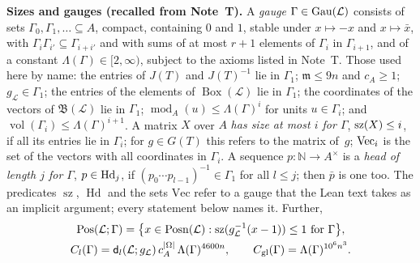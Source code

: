 \documentclass[11pt,a4paper]{article}
\newcommand{\m}[1]{\mbox{$#1$}}        %
\newcommand{\subhead}[1]{\par\addvspace{9pt plus 2pt}\Needspace{4\baselineskip}\noindent\textbf{#1}\enspace\ignorespaces}
\theoremstyle{plainx}
\theoremstyle{uprightx}
\newcommand{\cL}{\mathcal{L}}
\newcommand{\NN}{\mathbb{N}}
\newcommand{\GT}[1]{G(#1)}
\newcommand{\JT}[1]{J(#1)}
\newcommand{\modA}{\operatorname{mod}_A}
\newcommand{\gL}[1]{g_{#1}}
\newcommand{\BoxL}[1]{\operatorname{Box}(#1)}
\newcommand{\Posn}[1]{\operatorname{Posn}(#1)}
\newcommand{\Ball}[1]{\mathfrak{B}(#1)}
\newcommand{\vol}{\operatorname{vol}}
\begin{document}
\subhead{Sizes and gauges (recalled from Note~T).} A \emph{gauge} $\Gamma\in\Gauges{\cL}$ consists of sets
$\Gamma_0,\Gamma_1,\dots\subseteq A$, compact, containing $0$ and $1$, stable under $x\mapsto-x$ and $x\mapsto\bar x$,
with $\Gamma_i\Gamma_{i'}\subseteq\Gamma_{i+i'}$ and with sums of at most $r+1$ elements of $\Gamma_i$ in
$\Gamma_{i+1}$, and of a constant $\Lambda(\Gamma)\in[2,\infty)$, subject to the axioms listed in Note~T. Those used
here by name: the entries of $\JT{T}$ and $\JT{T}^{-1}$ lie in $\Gamma_1$; $\mathfrak{m}\le9n$ and $c_A\ge1$;
$\gL{\cL}\in\Gamma_1$; the entries of the elements of $\BoxL{\cL}$ lie in $\Gamma_1$; the coordinates of the vectors
of $\Ball{\cL}$ lie in $\Gamma_1$; $\modA(u)\le\Lambda(\Gamma)^{i}$ for units $u\in\Gamma_i$; and
$\vol(\Gamma_i)\le\Lambda(\Gamma)^{i+1}$. A matrix $X$ over $A$ \emph{has size at most $i$ for $\Gamma$},
\m{\HasMatSize{i}{X}}, if all its entries lie in $\Gamma_i$; for $g\in\GT{T}$ this refers to the matrix of~$g$;
$\mathrm{Vec}_{i}$ is the set of the vectors with all coordinates in $\Gamma_i$. A sequence $p\colon\NN\to A^{\times}$
is a \emph{head of length $j$ for $\Gamma$}, \m{\IsHead{j}{p}}, if $(p_0\cdots p_{l-1})^{-1}\in\Gamma_1$ for all
$l\le j$; then $\bar p$ is one too. The predicates $\operatorname{sz}$, $\operatorname{Hd}$ and the sets
$\mathrm{Vec}$ refer to a gauge that the Lean text takes as an implicit argument; every statement below names it.
Further,
\[\begin{gathered}
\positionsOfSize{\cL}{\Gamma}=\bigl\{x\in\Posn{\cL}:\HasMatSize{1}{\gL{\cL}^{-1}(x-1)}\ \text{for }\Gamma\bigr\},\\
\floorConst{\Gamma}{l}=\floorModulus{\cL}{l}{\gL{\cL}}\,c_A^{|\Omega|}\,\Lambda(\Gamma)^{4600n},\qquad
\globalConst{\Gamma}=\Lambda(\Gamma)^{10^{6}n^{3}}.
\end{gathered}\]
\end{document}
